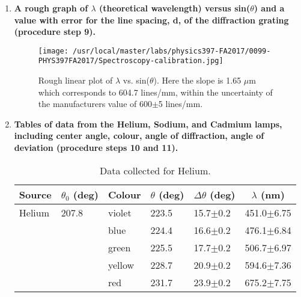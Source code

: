 \begin{enumerate}
\item {\bf A rough graph of $\lambda$ (theoretical wavelength) versus sin($\theta$) and a value with error for the line spacing, d, of the diffraction grating (procedure step 9).}\newline

\begin{figure}
\texttt{[image: /usr/local/master/labs/physics397-FA2017/0099-PHYS397FA2017/Spectroscopy-calibration.jpg]}
\caption{Rough linear plot of $\lambda$ vs. sin($\theta$). Here the slope is 1.65 $\mu$m which corresponds to 604.7 lines/mm, within the uncertainty of the manufacturers value of 600$\pm$5 lines/mm.}
\label{fig:spcg1}
\end{figure}

\item {\bf Tables of data from the Helium, Sodium, and Cadmium lamps, including center angle, colour, angle of diffraction, angle of deviation (procedure steps 10 and 11).}\newline

\begin{table}[ht]
\center
\begin{tabular}{|l|l|l|l|l|l|}
\hline
\multicolumn{1}{|c|}{Source} & \multicolumn{1}{c|}{$\theta_0$ (deg)} & \multicolumn{1}{c|}{Colour} & \multicolumn{1}{c|}{$\theta$ (deg)} & \multicolumn{1}{c|}{$\Delta\theta$ (deg)} & \multicolumn{1}{c|}{$\lambda$ (nm)} \\ \hline
Helium                                   & 207.8                                 & violet                      & 223.5                               & 15.7$\pm$0.2                              & 451.0$\pm$6.75                      \\ \hline
                                         &                                       & blue                        & 224.4                               & 16.6$\pm$0.2                              & 476.1$\pm$6.84                      \\ \hline
                                         &                                       & green                       & 225.5                               & 17.7$\pm$0.2                              & 506.7$\pm$6.97                      \\ \hline
                                         &                                       & yellow                      & 228.7                               & 20.9$\pm$0.2                              & 594.6$\pm$7.36                      \\ \hline
                                         &                                       & red                         & 231.7                               & 23.9$\pm$0.2                              & 675.2$\pm$7.75                      \\ \hline
\end{tabular}
\caption{Data collected for Helium.}
\label{tab:spcg3}
\end{table}



\end{enumerate}
